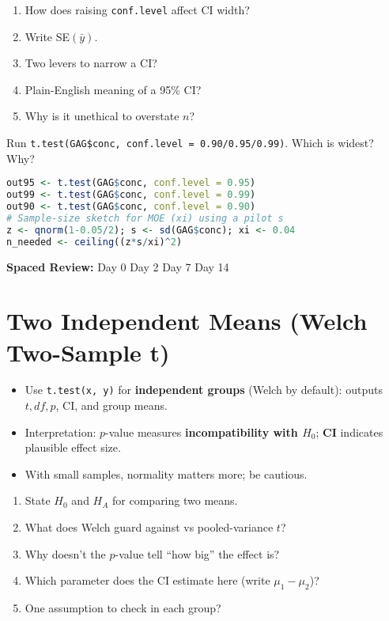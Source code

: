 \documentclass[11pt,a4paper]{article}
\newcommand{\reviewticks}{
  \vspace{0.4em}
  \noindent\scriptsize\textbf{Spaced Review:}
  \fbox{\phantom{D0}} Day 0\quad
  \fbox{\phantom{D2}} Day 2\quad
  \fbox{\phantom{D7}} Day 7\quad
  \fbox{\phantom{D14}} Day 14
}
\begin{document}
\begin{recallbox}
\begin{enumerate}
  \item How does raising \texttt{conf.level} affect CI width?
  \item Write SE\((\bar{y})\).
  \item Two levers to narrow a CI?
  \item Plain-English meaning of a 95\% CI?
  \item Why is it unethical to overstate \(n\)?
\end{enumerate}
\end{recallbox}

\begin{practicebox}
Run \texttt{t.test(GAG\$conc, conf.level = 0.90/0.95/0.99)}. Which is widest? Why?
\end{practicebox}

\begin{rbox}
\begin{lstlisting}[language=R]
out95 <- t.test(GAG$conc, conf.level = 0.95)
out99 <- t.test(GAG$conc, conf.level = 0.99)
out90 <- t.test(GAG$conc, conf.level = 0.90)
# Sample-size sketch for MOE (xi) using a pilot s
z <- qnorm(1-0.05/2); s <- sd(GAG$conc); xi <- 0.04
n_needed <- ceiling((z*s/xi)^2)
\end{lstlisting}
\end{rbox}

\reviewticks

\section{Two Independent Means (Welch Two-Sample t)}

\begin{corebox}
\begin{itemize}
  \item Use \texttt{t.test(x, y)} for \textbf{independent groups} (Welch by default): outputs \(t, df, p\), CI, and group means.
  \item Interpretation: \(p\)-value measures \textbf{incompatibility with \(H_0\)}; \textbf{CI} indicates plausible effect size.
  \item With small samples, normality matters more; be cautious.
\end{itemize}
\end{corebox}

\begin{recallbox}
\begin{enumerate}
  \item State \(H_0\) and \(H_A\) for comparing two means.
  \item What does Welch guard against vs pooled-variance \(t\)?
  \item Why doesn’t the \(p\)-value tell ``how big'' the effect is?
  \item Which parameter does the CI estimate here (write \(\mu_1 - \mu_2\))?
  \item One assumption to check in each group?
\end{enumerate}
\end{recallbox}
\end{document}
